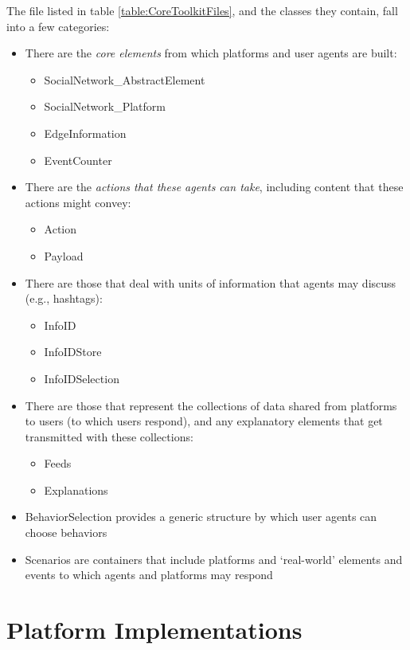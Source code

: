 The file listed in table \ref{table:CoreToolkitFiles}, and the classes they contain, fall into a few categories: 
\begin{itemize}  
\item There are the \textit{core elements} from which platforms and user agents are built:
   \begin{itemize}
	\item SocialNetwork\_AbstractElement 
	\item SocialNetwork\_Platform
	\item EdgeInformation 
	\item EventCounter
   \end{itemize}
\item There are the \textit{actions that these agents can take}, including content that these actions might convey:
    \begin{itemize}
	\item Action
	\item Payload 
   \end{itemize}
\item There are those that deal with units of information that agents may discuss (e.g., hashtags):
   \begin{itemize}
	\item InfoID
	\item InfoIDStore
	\item InfoIDSelection 
    \end{itemize}
\item  There are those that represent the collections of data shared from platforms to users (to which users respond), and any explanatory elements that get transmitted with these collections:
    \begin{itemize}
    	\item Feeds
	\item Explanations
   \end{itemize}
\item BehaviorSelection provides a generic structure by which user agents can choose behaviors
\item Scenarios are containers that include platforms and `real-world' elements and events to which agents and platforms may respond
\end{itemize}


\section{Platform Implementations}

